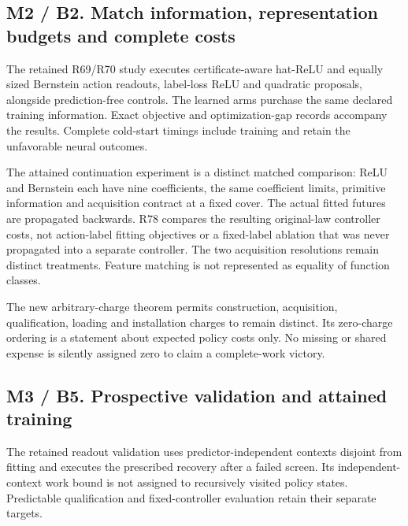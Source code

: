 \hypertarget{m2-b2.-match-information-representation-budgets-and-complete-costs}{%
\subsection{M2 / B2. Match information, representation budgets and
complete
costs}\label{m2-b2.-match-information-representation-budgets-and-complete-costs}}

The retained R69/R70 study executes certificate-aware hat-ReLU and
equally sized Bernstein action readouts, label-loss ReLU and quadratic
proposals, alongside prediction-free controls. The learned arms purchase
the same declared training information. Exact objective and
optimization-gap records accompany the results. Complete cold-start
timings include training and retain the unfavorable neural outcomes.

The attained continuation experiment is a distinct matched comparison:
ReLU and Bernstein each have nine coefficients, the same coefficient
limits, primitive information and acquisition contract at a fixed cover.
The actual fitted futures are propagated backwards. R78 compares the
resulting original-law controller costs, not action-label fitting
objectives or a fixed-label ablation that was never propagated into a
separate controller. The two acquisition resolutions remain distinct
treatments. Feature matching is not represented as equality of function
classes.

The new arbitrary-charge theorem permits construction, acquisition,
qualification, loading and installation charges to remain distinct. Its
zero-charge ordering is a statement about expected policy costs only. No
missing or shared expense is silently assigned zero to claim a
complete-work victory.

\hypertarget{m3-b5.-prospective-validation-and-attained-training}{%
\subsection{M3 / B5. Prospective validation and attained
training}\label{m3-b5.-prospective-validation-and-attained-training}}

The retained readout validation uses predictor-independent contexts
disjoint from fitting and executes the prescribed recovery after a
failed screen. Its independent-context work bound is not assigned to
recursively visited policy states. Predictable qualification and
fixed-controller evaluation retain their separate targets.

